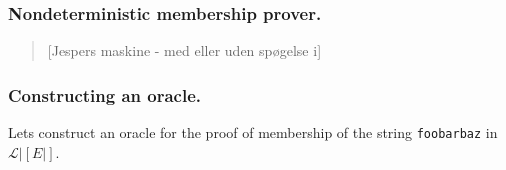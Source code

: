 \documentclass[slidestop,compress,mathserif, xcolor=table]{beamer}
\begin{document}
\begin{frame}
  \frametitle{Nondeterministic membership prover.}

  \begin{quote}
    [Jespers maskine - med eller uden spøgelse i]
  \end{quote}
\end{frame}

\begin{frame}
  \frametitle{Constructing an oracle.}
  Lets construct an oracle for the proof of membership of the string
  \texttt{foobarbaz} in $\mathcal{L}|[E|]$.\\[1em]
\end{frame}
\end{document}
